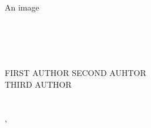 \begin{titlepage}
	\begin{flushleft}
		\begin{center}
			{An image}\\[10cm]
		\end{center}
		
		{\noindent {\Huge \thesistitle} \\[.5cm]
		\LARGE{\thesissubtitle} \\ [.5cm]
		\emph{\Large \thesistype \\ \thesisprogramme} \\[.8cm]

		{\LARGE{
			FIRST AUTHOR \hspace{3cm} SECOND AUHTOR \\
			\vspace{.2cm}
			THIRD AUTHOR
		}}\\[.8cm]

		{\Large \thesisdepartment \\
			\textsc{\thesisorganization} \\
			\thesislocationcity, \thesislocationcountry\;\thesiscopyrightyear \\
		} 
		}
	\end{flushleft}
\end{titlepage}



